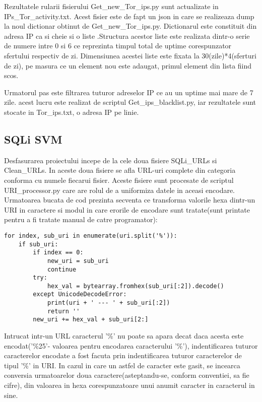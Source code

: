 Rezultatele rularii fisierului Get\_new\_Tor\_ips.py sunt actualizate in IPs\_Tor\_activity.txt. Acest fisier este de fapt un json in care se realizeaza dump la noul dictionar obtinut de  Get\_new\_Tor\_ips.py. Dictionarul este constituit din adresa IP ca si cheie si o liste .Structura acestor liste este realizata dintr-o serie de numere intre 0 si 6 ce reprezinta timpul total de uptime corespunzator sfertului respectiv de zi. Dimensiunea acestei liste este fixata la 30(zile)*4(sferturi de zi), pe masura ce un element nou este adaugat, primul element din lista fiind scos.

Urmatorul pas este filtrarea tuturor adreselor IP ce au un uptime mai mare de 7 zile. acest lucru este realizat de scriptul Get\_ips\_blacklist.py, iar rezultatele sunt stocate in Tor\_ips.txt, o adresa IP pe linie.

\subsection{SQLi SVM}
Desfasurarea proiectului incepe de la cele doua fisiere SQLi\_URLs si Clean\_URLs. In aceste doua fisiere se afla URL-uri complete din categoria conforma cu numele fiecarui fisier. Aceste fisiere sunt procesate de scriptul URI\_processor.py care are rolul de a uniformiza datele in aceasi encodare. Urmatoarea bucata de cod prezinta secventa ce transforma valorile hexa dintr-un URI in caractere si modul in care erorile de encodare sunt tratate(sunt printate pentru a fi tratate manual de catre programator):

\lstset{language=python,frame=single, showstringspaces=false}
\begin{lstlisting}
for index, sub_uri in enumerate(uri.split('%')):
    if sub_uri:
        if index == 0:
            new_uri = sub_uri
            continue
        try:
            hex_val = bytearray.fromhex(sub_uri[:2]).decode()
        except UnicodeDecodeError:
            print(uri + ' --- ' + sub_uri[:2])
            return ''
        new_uri += hex_val + sub_uri[2:]
\end{lstlisting}
Intrucat intr-un URL caracterul '\%' nu poate sa apara decat daca acesta este encodat('\%25'- valoarea pentru encodarea caracterului '\%'), indentificarea tuturor caracterelor encodate a fost facuta prin indentificarea tuturor caracterelor de tipul '\%' in URI. In cazul in care un astfel de caracter este gasit, se incearca conversia urmatoarelor doua caractere(asteptandu-se, conform conventiei, sa fie cifre), din valoarea in hexa corespunzatoare unui anumit caracter in caracterul in sine.



